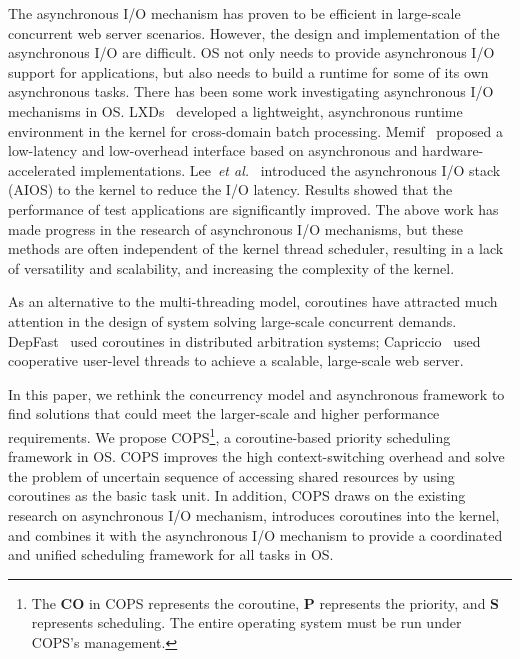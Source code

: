 \documentclass[sigconf,review,anonymous]{acmart}
\begin{document}
The asynchronous I/O mechanism has proven to be efficient in large-scale concurrent web server scenarios. However, the design and implementation of the asynchronous I/O are difficult. OS not only needs to provide asynchronous I/O support for applications, but also needs to build a runtime for some of its own asynchronous tasks. There has been some work investigating asynchronous I/O mechanisms in OS. LXDs~\cite{narayanan2019lxds} developed a lightweight, asynchronous runtime environment in the kernel for cross-domain batch processing. Memif~\cite{lin2016memif} proposed a low-latency and low-overhead interface based on asynchronous and hardware-accelerated implementations. Lee~\textit{et al.}~\cite{lee2019asynchronous} introduced the asynchronous I/O stack (AIOS) to the kernel to reduce the I/O latency. Results showed that the performance of test applications are significantly improved. The above work has made progress in the research of asynchronous I/O mechanisms, but these methods are often independent of the kernel thread scheduler, resulting in a lack of versatility and scalability, and increasing the complexity of the kernel.

As an alternative to the multi-threading model, coroutines have attracted much attention in the design of system solving large-scale concurrent demands. DepFast~\cite{luo_depfast_nodate} used coroutines in distributed arbitration systems; Capriccio~\cite{von_behren_capriccio_2003} used cooperative user-level threads to achieve a scalable, large-scale web server. 



In this paper, we rethink the concurrency model and asynchronous framework to find solutions that could meet the larger-scale and higher performance requirements. We propose COPS\footnote{The \textbf{CO} in COPS represents the coroutine, \textbf{P} represents the priority, and \textbf{S} represents scheduling. The entire operating system must be run under COPS's management.}, a coroutine-based priority scheduling framework in OS. COPS improves the high context-switching overhead and solve the problem of uncertain sequence of accessing shared resources by using coroutines as the basic task unit. In addition, COPS draws on the existing research on asynchronous I/O mechanism, introduces coroutines into the kernel, and combines it with the asynchronous I/O mechanism to provide a coordinated and unified scheduling framework for all tasks in OS. 
\end{document}
